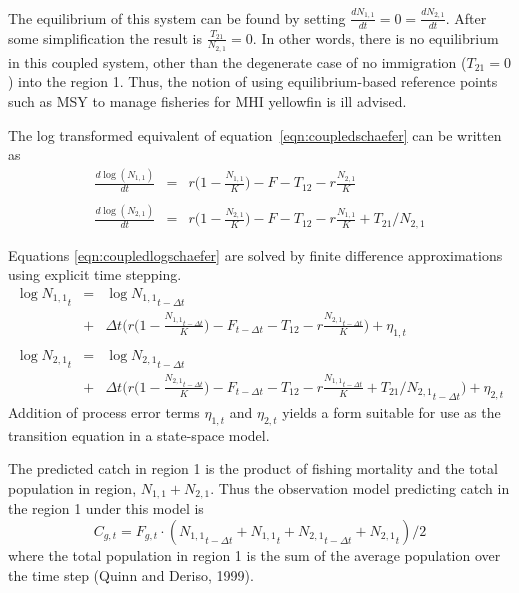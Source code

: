\documentclass[12pt,letterpaper]{article}
\newcommand\None{{N_{1,1}}}
\newcommand\Ntwo{{N_{2,1}}}
\begin{document}
The equilibrium of this system can be found by setting
$\frac{d\None}{dt} = 0 = \frac{d\Ntwo}{dt}$. After some simplification
the result is $\frac{T_{21}}{\Ntwo} = 0$. In other words, there is no
equilibrium in this coupled system, other than the degenerate case of
no immigration ($T_{21}=0$) into the region 1. Thus, the notion of using
equilibrium-based reference points such as MSY to manage fisheries for
MHI yellowfin is ill advised.


The log transformed equivalent of equation~\ref{eqn:coupledschaefer} can be written as
\begin{eqnarray}
\frac{d\log(\None)}{dt}&=&r\Big(1-\frac{\None}{K}\Big) -F - T_{12} -
r\frac{\Ntwo}{K}\nonumber\\
\\
\frac{d\log(\Ntwo)}{dt}&=&r\Big(1-\frac{\Ntwo}{K}\Big) -F - T_{12} -
r\frac{\None}{K} + T_{21}/\Ntwo\nonumber
\label{eqn:coupledlogschaefer}
\end{eqnarray}

Equations \ref{eqn:coupledlogschaefer} are solved by finite difference
approximations using explicit time stepping.
\begin{eqnarray}
\log \None_t &=& \log \None_{t-\Delta t}\nonumber\\ 
             &+&\Delta t\bigg(r\Big(1-\frac{\None_{t-\Delta t}}{K}\Big)
-F_{t-\Delta t} - T_{12} - r\frac{\Ntwo_{t-\Delta
t}}{K}\bigg)+\eta_{1,t}\nonumber\\
\\
\log \Ntwo_t &=& \log \Ntwo_{t-\Delta t}\nonumber\\
             &+&\Delta t\bigg(r\Big(1-\frac{\Ntwo_{t-\Delta t}}{K}\Big)
-F_{t-\Delta t} - T_{12} - r\frac{\None_{t-\Delta t}}{K}
     +T_{21}/\Ntwo_{t-\Delta t}\bigg)+\eta_{2,t}\nonumber
\label{eqn:finitecoupledlogschaefer}
\end{eqnarray}
Addition of process error terms $\eta_{1,t}$ and $\eta_{2,t}$ yields a form suitable
for use as the transition equation in a state-space model.

The predicted catch in region 1 is the product of fishing mortality
and the total population in region, $\None+\Ntwo$.
Thus the observation model predicting catch in the region 1
under this model is
\begin{equation}
C_{g,t} = F_{g,t}\cdot(\None_{t-\Delta t}+\None_t+\Ntwo_{t-\Delta t}+\Ntwo_t)/2
\label{eqn:catcheqn}
\end{equation}
where the total population in region 1 is the sum of the average
population over the time step (Quinn and Deriso, 1999).
\end{document}
